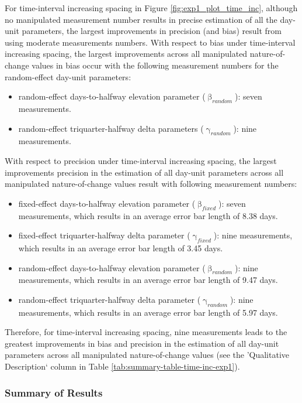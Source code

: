\documentclass[
12pt, %
twoside,
english]{guelphthesis}
\theoremstyle{definition}
\theoremstyle{definition}
\theoremstyle{definition}
\theoremstyle{definition}
\theoremstyle{remark}
\begin{document}
For time-interval increasing spacing in Figure \ref{fig:exp1_plot_time_inc}, although no manipulated measurement number results in precise estimation of all the day-unit parameters, the largest improvements in precision (and bias) result from using moderate measurements numbers. With respect to bias under time-interval increasing spacing, the largest improvements across all manipulated nature-of-change values in bias occur with the following measurement numbers for the random-effect day-unit parameters:
\begin{itemize}
\tightlist
\item
  random-effect days-to-halfway elevation parameter (\(\upbeta_{random}\)): seven measurements.
\item
  random-effect triquarter-halfway delta parameters (\(\upgamma_{random}\)): nine measurements.
\end{itemize}
\noindent With respect to precision under time-interval increasing spacing, the largest improvements precision in the estimation of all day-unit parameters across all manipulated nature-of-change values result with following measurement numbers:
\begin{itemize}
\tightlist
\item
  fixed-effect days-to-halfway elevation parameter (\(\upbeta_{fixed}\)): seven measurements, which results in an average error bar length of 8.38 days.
\item
  fixed-effect triquarter-halfway delta parameter (\(\upgamma_{fixed}\)): nine measurements, which results in an average error bar length of 3.45 days.
\item
  random-effect days-to-halfway elevation parameter (\(\upbeta_{random}\)): nine measurements, which results in an average error bar length of 9.47 days.
\item
  random-effect triquarter-halfway delta parameter (\(\upgamma_{random}\)): nine measurements, which results in an average error bar length of 5.97 days.
\end{itemize}
\noindent Therefore, for time-interval increasing spacing, nine measurements leads to the greatest improvements in bias and precision in the estimation of all day-unit parameters across all manipulated nature-of-change values (see the 'Qualitative Description` column in Table \ref{tab:summary-table-time-inc-exp1}).

\hypertarget{summary-of-results-1}{%
\subsubsection{Summary of Results}\label{summary-of-results-1}}
\end{document}
